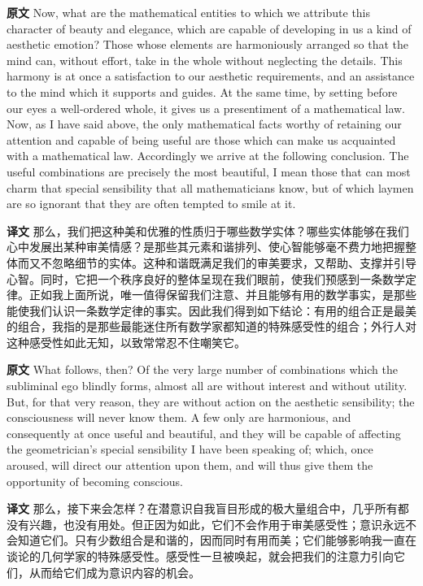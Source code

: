 \documentclass[UTF8]{ctexart}
\newenvironment{english}{\par\small\noindent\textbf{原文}\quad\ignorespaces}{\par}
\newenvironment{zhtranslation}{\par\noindent\textbf{译文}\quad\ignorespaces}{\par\vspace{0.35em}}
\begin{document}
\begin{english}
Now, what are the mathematical entities to which we attribute this character of beauty and elegance, which are capable of developing in us a kind of aesthetic emotion? Those whose elements are harmoniously arranged so that the mind can, without effort, take in the whole without neglecting the details. This harmony is at once a satisfaction to our aesthetic requirements, and an assistance to the mind which it supports and guides. At the same time, by setting before our eyes a well-ordered whole, it gives us a presentiment of a mathematical law. Now, as I have said above, the only mathematical facts worthy of retaining our attention and capable of being useful are those which can make us acquainted with a mathematical law. Accordingly we arrive at the following conclusion. The useful combinations are precisely the most beautiful, I mean those that can most charm that special sensibility that all mathematicians know, but of which laymen are so ignorant that they are often tempted to smile at it.
\end{english}
\begin{zhtranslation}
那么，我们把这种美和优雅的性质归于哪些数学实体？哪些实体能够在我们心中发展出某种审美情感？是那些其元素和谐排列、使心智能够毫不费力地把握整体而又不忽略细节的实体。这种和谐既满足我们的审美要求，又帮助、支撑并引导心智。同时，它把一个秩序良好的整体呈现在我们眼前，使我们预感到一条数学定律。正如我上面所说，唯一值得保留我们注意、并且能够有用的数学事实，是那些能使我们认识一条数学定律的事实。因此我们得到如下结论：有用的组合正是最美的组合，我指的是那些最能迷住所有数学家都知道的特殊感受性的组合；外行人对这种感受性如此无知，以致常常忍不住嘲笑它。\end{zhtranslation}

\begin{english}
What follows, then? Of the very large number of combinations which the subliminal ego blindly forms, almost all are without interest and without utility. But, for that very reason, they are without action on the aesthetic sensibility; the consciousness will never know them. A few only are harmonious, and consequently at once useful and beautiful, and they will be capable of affecting the geometrician's special sensibility I have been speaking of; which, once aroused, will direct our attention upon them, and will thus give them the opportunity of becoming conscious.
\end{english}
\begin{zhtranslation}
那么，接下来会怎样？在潜意识自我盲目形成的极大量组合中，几乎所有都没有兴趣，也没有用处。但正因为如此，它们不会作用于审美感受性；意识永远不会知道它们。只有少数组合是和谐的，因而同时有用而美；它们能够影响我一直在谈论的几何学家的特殊感受性。感受性一旦被唤起，就会把我们的注意力引向它们，从而给它们成为意识内容的机会。\end{zhtranslation}
\end{document}
